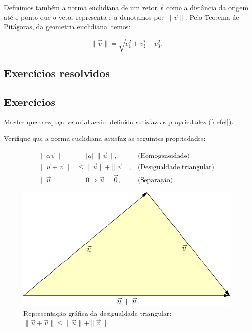 Definimos também a norma euclidiana de um vetor $\vec{v}$ como a distância da origem até o ponto que o vetor representa e a denotamos por $\|\vec{v}\|$. Pelo Teorema de Pitágoras, da geometria euclidiana, temos:


\begin{equation}\label{defnorma}\|\vec{v}\|=\sqrt{v_1^2+v_2^2+v_3^2}.\end{equation}

\subsection*{Exercícios resolvidos}

\construirExeresol

\subsection*{Exercícios}

\begin{exer} Mostre que o espaço vetorial assim definido satisfaz as propriedades (\ref{defel}).
\end{exer}

\begin{exer}\label{exnorma}Verifique que a norma euclidiana satisfaz as seguintes propriedades:

\begin{subequations}\label{propnorma}
\begin{align}
\|\alpha \vec{u}\|&=|\alpha|~\!\|\vec{u}\|,&\text{(Homogeneidade)}\label{propnormahom}\\
\|\vec{u}+\vec{v}\|&\leq \|\vec{u}\|+\|\vec{v}\|,&\text{(Desigualdade triangular)}\label{propnormatri}\\
\|\vec{u}\|&=0 \Longrightarrow \vec{u}=\vec{0},&\text{(Separação)}\label{propnormasep}
\end{align}
\end{subequations}
\end{exer}

\begin{figure}%
\begin{center}
 \includegraphics{./cap_algvet/figs/desigualdade_triangulo}
      \caption{Representação gráfica da desigualdade triangular: $\|\vec{u}+\vec{v}\|\leq \|\vec{u}\|+\|\vec{v}\|$}
      \label{fig:des_triang}
      \end{center}
   \end{figure}

